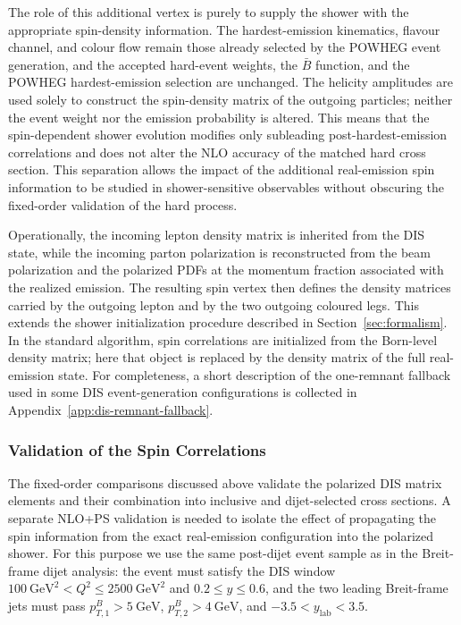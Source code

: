 \documentclass[a4paper,11pt]{article}
\begin{document}
The role of this additional vertex is purely to supply the shower with the
appropriate spin-density information. The hardest-emission kinematics, flavour
channel, and colour flow remain those already selected by the POWHEG event
generation, and the accepted hard-event weights, the $\bar B$ function, and the
POWHEG hardest-emission selection are unchanged. The helicity amplitudes are
used solely to construct the spin-density matrix of the outgoing particles;
neither the event weight nor the emission probability is altered. This
means that the spin-dependent shower evolution modifies only subleading
post-hardest-emission correlations and does not alter the NLO accuracy of the
matched hard cross section. This
separation allows the impact of the additional real-emission spin information
to be studied in shower-sensitive observables without obscuring the fixed-order
validation of the hard process.

Operationally, the incoming lepton density matrix is inherited from the DIS
state, while the incoming parton polarization is reconstructed from the beam
polarization and the polarized PDFs at the momentum fraction associated with
the realized emission. The resulting spin vertex then defines the density
matrices carried by the outgoing lepton and by the two outgoing coloured legs.
This extends the shower initialization procedure described in
Section~\ref{sec:formalism}. In the standard algorithm, spin correlations are
initialized from the Born-level density matrix; here that object is replaced by
the density matrix of the full real-emission state.
For completeness, a short description of the one-remnant fallback used in some
DIS event-generation configurations is collected in Appendix~\ref{app:dis-remnant-fallback}.

\subsubsection{Validation of the Spin Correlations}
The fixed-order comparisons discussed above validate the polarized DIS matrix
elements and their combination into inclusive and dijet-selected cross sections. A
separate NLO+PS validation is needed to isolate the effect of propagating the
spin information from the exact real-emission configuration into the polarized
shower. For this purpose we use the same post-dijet event sample as in the
Breit-frame dijet analysis: the event must satisfy the DIS window
$100~\mathrm{GeV}^2 < Q^2 \le 2500~\mathrm{GeV}^2$ and $0.2 \le y \le 0.6$, and the two
leading Breit-frame jets must pass
$p_{T,1}^{B}>5~\mathrm{GeV}$,
$p_{T,2}^{B}>4~\mathrm{GeV}$, and
$-3.5<y_{\mathrm{lab}}<3.5$.
\end{document}
